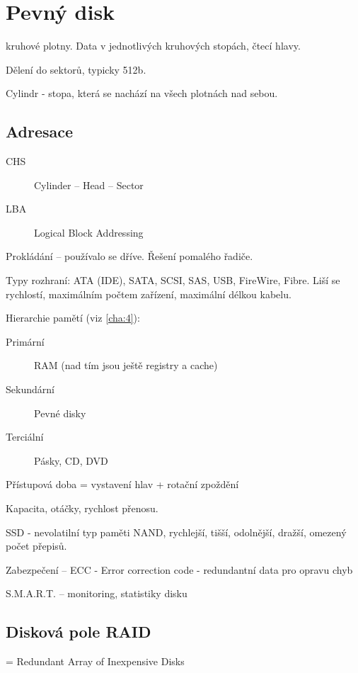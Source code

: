 \documentclass[a4paper, 11pt]{report}
\begin{document}
\section{Pevný disk}

kruhové plotny. Data v jednotlivých kruhových stopách, čtecí hlavy.

Dělení do sektorů, typicky 512b.

Cylindr - stopa, která se nachází na všech plotnách nad sebou.

\subsection{Adresace}
\begin{description}
	\item[CHS] Cylinder -- Head -- Sector
	\item[LBA] Logical Block Addressing
\end{description}

Prokládání -- používalo se dříve. Řešení pomalého řadiče.

Typy rozhraní: ATA (IDE), SATA, SCSI, SAS, USB, FireWire, Fibre. Liší se rychlostí, maximálním počtem zařízení, maximální délkou kabelu.

Hierarchie pamětí (viz \ref{cha:4}):
\begin{description}
	\item[Primární] RAM (nad tím jsou ještě registry a cache)
	\item[Sekundární] Pevné disky
	\item[Terciální] Pásky, CD, DVD
\end{description}

Přístupová doba = vystavení hlav + rotační zpoždění

Kapacita, otáčky, rychlost přenosu.

SSD - nevolatilní typ paměti NAND, rychlejší, tišší, odolnější, dražší, omezený počet přepisů.

Zabezpečení -- ECC - Error correction code - redundantní data pro opravu chyb

S.M.A.R.T. -- monitoring, statistiky disku

\subsection{Disková pole RAID}
 = Redundant Array of Inexpensive Disks
\end{document}
